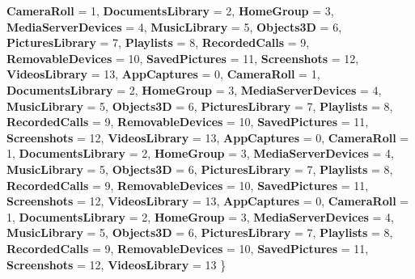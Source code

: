 \begin{DoxyCompactItemize}
{\bfseries Camera\+Roll} = 1, 
\newline
{\bfseries Documents\+Library} = 2, 
{\bfseries Home\+Group} = 3, 
{\bfseries Media\+Server\+Devices} = 4, 
{\bfseries Music\+Library} = 5, 
\newline
{\bfseries Objects3D} = 6, 
{\bfseries Pictures\+Library} = 7, 
{\bfseries Playlists} = 8, 
{\bfseries Recorded\+Calls} = 9, 
\newline
{\bfseries Removable\+Devices} = 10, 
{\bfseries Saved\+Pictures} = 11, 
{\bfseries Screenshots} = 12, 
{\bfseries Videos\+Library} = 13, 
\newline
{\bfseries App\+Captures} = 0, 
{\bfseries Camera\+Roll} = 1, 
{\bfseries Documents\+Library} = 2, 
{\bfseries Home\+Group} = 3, 
\newline
{\bfseries Media\+Server\+Devices} = 4, 
{\bfseries Music\+Library} = 5, 
{\bfseries Objects3D} = 6, 
{\bfseries Pictures\+Library} = 7, 
\newline
{\bfseries Playlists} = 8, 
{\bfseries Recorded\+Calls} = 9, 
{\bfseries Removable\+Devices} = 10, 
{\bfseries Saved\+Pictures} = 11, 
\newline
{\bfseries Screenshots} = 12, 
{\bfseries Videos\+Library} = 13, 
{\bfseries App\+Captures} = 0, 
{\bfseries Camera\+Roll} = 1, 
\newline
{\bfseries Documents\+Library} = 2, 
{\bfseries Home\+Group} = 3, 
{\bfseries Media\+Server\+Devices} = 4, 
{\bfseries Music\+Library} = 5, 
\newline
{\bfseries Objects3D} = 6, 
{\bfseries Pictures\+Library} = 7, 
{\bfseries Playlists} = 8, 
{\bfseries Recorded\+Calls} = 9, 
\newline
{\bfseries Removable\+Devices} = 10, 
{\bfseries Saved\+Pictures} = 11, 
{\bfseries Screenshots} = 12, 
{\bfseries Videos\+Library} = 13, 
\newline
{\bfseries App\+Captures} = 0, 
{\bfseries Camera\+Roll} = 1, 
{\bfseries Documents\+Library} = 2, 
{\bfseries Home\+Group} = 3, 
\newline
{\bfseries Media\+Server\+Devices} = 4, 
{\bfseries Music\+Library} = 5, 
{\bfseries Objects3D} = 6, 
{\bfseries Pictures\+Library} = 7, 
\newline
{\bfseries Playlists} = 8, 
{\bfseries Recorded\+Calls} = 9, 
{\bfseries Removable\+Devices} = 10, 
{\bfseries Saved\+Pictures} = 11, 
\newline
{\bfseries Screenshots} = 12, 
{\bfseries Videos\+Library} = 13
 \}
\item 
\mbox{\label{namespace_windows_1_1_storage_ad31753d0e1a55938e5b849af2661f220}} 

\end{DoxyCompactItemize}
